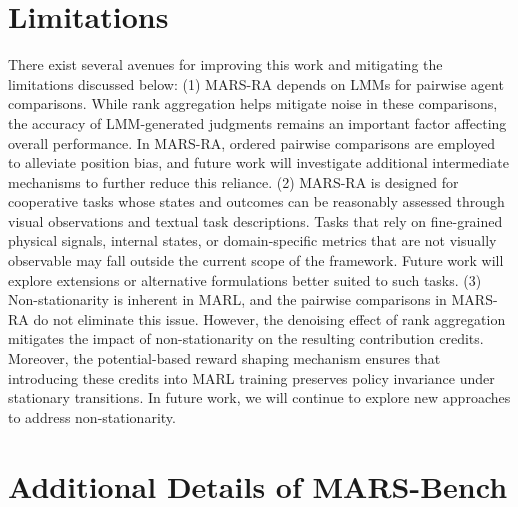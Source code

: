 \documentclass[11pt]{article}
\begin{document}
%

%

%

%


%

%
%

\section{Limitations}

There exist several avenues for improving this work and mitigating the limitations discussed below: (1) MARS-RA depends on LMMs for pairwise agent comparisons. While rank aggregation helps mitigate noise in these comparisons, the accuracy of LMM-generated judgments remains an important factor affecting overall performance. In MARS-RA, ordered pairwise comparisons are employed to alleviate position bias, and future work will investigate additional intermediate mechanisms to further reduce this reliance. (2) MARS-RA is designed for cooperative tasks whose states and outcomes can be reasonably assessed through visual observations and textual task descriptions. Tasks that rely on fine-grained physical signals, internal states, or domain-specific metrics that are not visually observable may fall outside the current scope of the framework. Future work will explore extensions or alternative formulations better suited to such tasks. (3) Non-stationarity is inherent in MARL, and the pairwise comparisons in MARS-RA do not eliminate this issue. However, the denoising effect of rank aggregation mitigates the impact of non-stationarity on the resulting contribution credits. Moreover, the potential-based reward shaping mechanism ensures that introducing these credits into MARL training preserves policy invariance under stationary transitions. In future work, we will continue to explore new approaches to address non-stationarity.


%


%

%

%


%


\newpage

\appendix%

\section{Additional Details of MARS-Bench}
\label{appendix:mars-bench}
\end{document}
